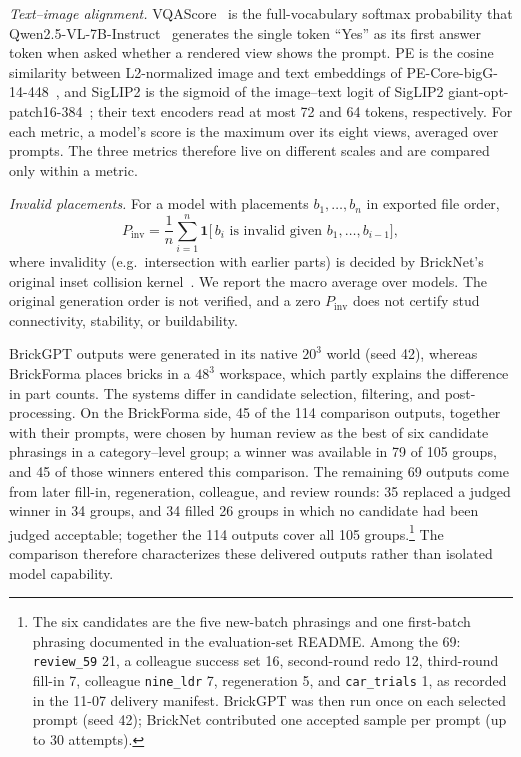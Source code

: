 \documentclass[letterpaper]{article} %
\begin{document}
\emph{Text--image alignment.} VQAScore~\cite{vqascore} is the full-vocabulary softmax probability that Qwen2.5-VL-7B-Instruct~\cite{qwen25vl} generates the single token ``Yes'' as its first answer token when asked whether a rendered view shows the prompt. PE is the cosine similarity between L2-normalized image and text embeddings of PE-Core-bigG-14-448~\cite{pe}, and SigLIP2 is the sigmoid of the image--text logit of SigLIP2 giant-opt-patch16-384~\cite{siglip2}; their text encoders read at most 72 and 64 tokens, respectively. For each metric, a model's score is the maximum over its eight views, averaged over prompts. The three metrics therefore live on different scales and are compared only within a metric.

\emph{Invalid placements.} For a model with placements $b_1,\ldots,b_n$ in exported file order,
\begin{equation}
P_{\mathrm{inv}} = \frac{1}{n}\sum_{i=1}^{n}\mathbf{1}\big[\,b_i \text{ is invalid given } b_1,\ldots,b_{i-1}\big],
\end{equation}
where invalidity (e.g.\ intersection with earlier parts) is decided by BrickNet's original inset collision kernel~\cite{bricknet}. We report the macro average over models. The original generation order is not verified, and a zero $P_{\mathrm{inv}}$ does not certify stud connectivity, stability, or buildability.

BrickGPT outputs were generated in its native $20^3$ world (seed 42), whereas BrickForma places bricks in a $48^3$ workspace, which partly explains the difference in part counts.
The systems differ in candidate selection, filtering, and post-processing.
On the BrickForma side, 45 of the 114 comparison outputs, together with their prompts, were chosen by human review as the best of six candidate phrasings in a category--level group; a winner was available in 79 of 105 groups, and 45 of those winners entered this comparison.
The remaining 69 outputs come from later fill-in, regeneration, colleague, and review rounds: 35 replaced a judged winner in 34 groups, and 34 filled 26 groups in which no candidate had been judged acceptable; together the 114 outputs cover all 105 groups.\footnote{The six candidates are the five new-batch phrasings and one first-batch phrasing documented in the evaluation-set README. Among the 69: \texttt{review\_59} 21, a colleague success set 16, second-round redo 12, third-round fill-in 7, colleague \texttt{nine\_ldr} 7, regeneration 5, and \texttt{car\_trials} 1, as recorded in the 11-07 delivery manifest. BrickGPT was then run once on each selected prompt (seed 42); BrickNet contributed one accepted sample per prompt (up to 30 attempts).}
The comparison therefore characterizes these delivered outputs rather than isolated model capability.
\end{document}
